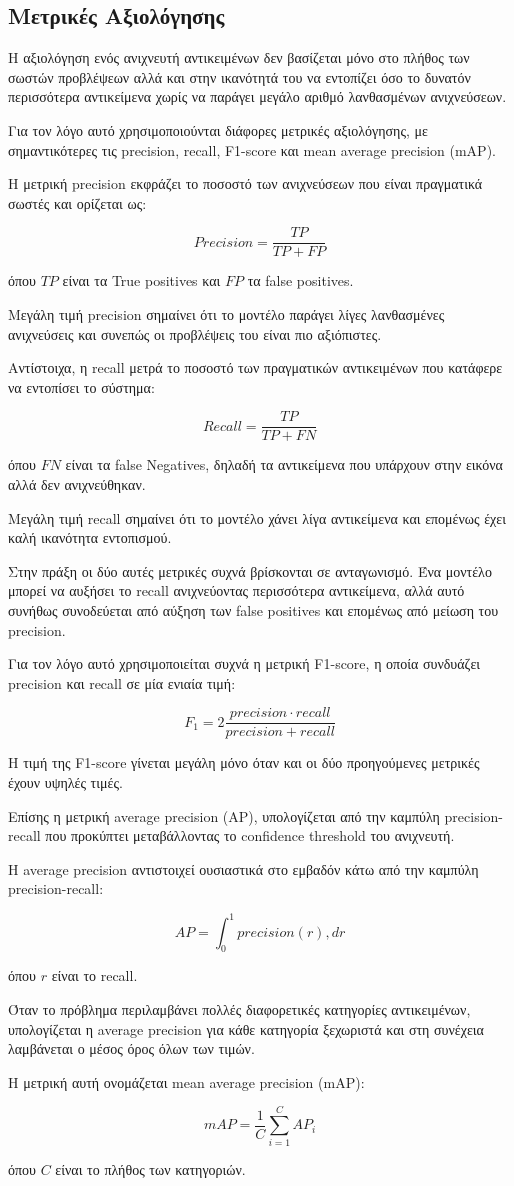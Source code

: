 \documentclass[12pt]{article}
\begin{document}
\subsection{Μετρικές Αξιολόγησης}

Η αξιολόγηση ενός ανιχνευτή αντικειμένων δεν βασίζεται μόνο στο πλήθος των σωστών προβλέψεων αλλά και στην ικανότητά του να εντοπίζει όσο το δυνατόν 
περισσότερα αντικείμενα χωρίς να παράγει μεγάλο αριθμό λανθασμένων ανιχνεύσεων.

Για τον λόγο αυτό χρησιμοποιούνται διάφορες μετρικές αξιολόγησης, με σημαντικότερες τις precision, recall, F1-score και mean average precision (mAP).

Η μετρική precision εκφράζει το ποσοστό των ανιχνεύσεων που είναι πραγματικά σωστές και ορίζεται ως:

\[
Precision=
\frac{TP}
{TP+FP}
\]

όπου $TP$ είναι τα True positives και $FP$ τα false positives.

Μεγάλη τιμή precision σημαίνει ότι το μοντέλο παράγει λίγες λανθασμένες ανιχνεύσεις και συνεπώς οι προβλέψεις του είναι πιο αξιόπιστες.

Αντίστοιχα, η recall μετρά το ποσοστό των πραγματικών αντικειμένων που κατάφερε να εντοπίσει το σύστημα:

\[
Recall=
\frac{TP}
{TP+FN}
\]

όπου $FN$ είναι τα false Negatives, δηλαδή τα αντικείμενα που υπάρχουν στην εικόνα αλλά δεν ανιχνεύθηκαν.

Μεγάλη τιμή recall σημαίνει ότι το μοντέλο χάνει λίγα αντικείμενα και επομένως έχει καλή ικανότητα εντοπισμού.

Στην πράξη οι δύο αυτές μετρικές συχνά βρίσκονται σε ανταγωνισμό. Ένα μοντέλο μπορεί να αυξήσει το recall ανιχνεύοντας περισσότερα αντικείμενα, αλλά 
αυτό συνήθως συνοδεύεται από αύξηση των false positives και επομένως από μείωση του precision.

Για τον λόγο αυτό χρησιμοποιείται συχνά η μετρική F1-score, η οποία συνδυάζει precision και recall σε μία ενιαία τιμή:

\[
F_1=
2
\frac{precision \cdot recall}
{precision+recall}
\]

Η τιμή της F1-score γίνεται μεγάλη μόνο όταν και οι δύο προηγούμενες μετρικές έχουν υψηλές τιμές.

Επίσης η μετρική average precision (AP), υπολογίζεται από την καμπύλη 
precision-recall που προκύπτει μεταβάλλοντας το confidence threshold του ανιχνευτή.

Η average precision αντιστοιχεί ουσιαστικά στο εμβαδόν κάτω από την καμπύλη precision-recall:

\[
AP=
\int_0^1 precision(r),dr
\]

όπου $r$ είναι το recall.

Όταν το πρόβλημα περιλαμβάνει πολλές διαφορετικές κατηγορίες αντικειμένων, υπολογίζεται η average precision για κάθε κατηγορία ξεχωριστά και 
στη συνέχεια λαμβάνεται ο μέσος όρος όλων των τιμών.

Η μετρική αυτή ονομάζεται mean average precision (mAP):

\[
mAP=
\frac{1}{C}
\sum_{i=1}^{C}
AP_i
\]

όπου $C$ είναι το πλήθος των κατηγοριών.
\end{document}
